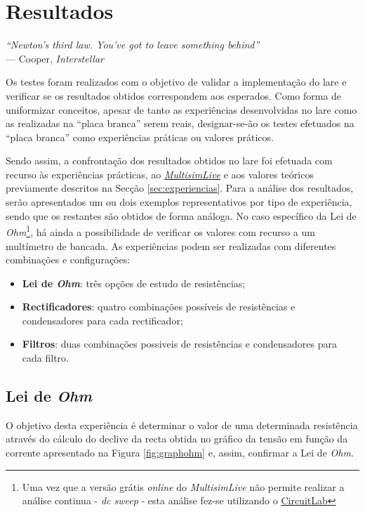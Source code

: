 \chapter{Resultados}
\label{Capítulo5}

\begin{flushright}
\textit{``Newton's third law. You've got to leave something behind''} \\[0.5em]
--- Cooper, \textit{Interstellar}
\end{flushright}

Os testes foram realizados com o objetivo de validar a implementação do \acrshort{lare} e verificar se os resultados obtidos correspondem aos esperados. Como forma de uniformizar conceitos, apesar de tanto as experiências desenvolvidas no \acrshort{lare} como as realizadas na ``placa branca'' serem reais, designar-se-ão os testes efetuados na ``placa branca'' como experiências práticas ou valores práticos.

Sendo assim, a confrontação dos resultados obtidos no \acrshort{lare} foi efetuada com recurso às experiências prácticas, ao \href{https://www.multisim.com}{\textit{MultisimLive}} e aos valores teóricos previamente descritos na Secção \ref{sec:experiencias}. Para a análise dos resultados, serão apresentados um ou dois exemplos representativos por tipo de experiência, sendo que os restantes são obtidos de forma análoga. No caso específico da Lei de \textit{Ohm}\footnote{Uma vez que a versão grátis \textit{online} do \textit{MultisimLive} não permite realizar a análise continua - \textit{dc sweep} - esta análise fez-se utilizando o \href{https://www.circuitlab.com/}{CircuitLab}}, há ainda a possibilidade de verificar os valores com recurso a um multímetro de bancada. As experiências podem ser realizadas com diferentes combinações e configurações:

\begin{itemize}
	\item \textbf{Lei de \textit{Ohm}}: três opções de estudo de resistências;
	\item \textbf{Rectificadores}: quatro combinações possíveis de resistências e condensadores para cada rectificador;
	\item \textbf{Filtros}: duas combinações possiveis de resistências e condensadores para cada filtro.
\end{itemize}

\section{Lei de \textit{Ohm}}
\label{sec:resultados_lei_de_ohm}
O objetivo desta experiência é determinar o valor de uma determinada resistência através do cálculo do declive da recta obtida no gráfico da tensão em função da corrente apresentado na Figura \ref{fig:graphohm} e, assim, confirmar a Lei de \textit{Ohm}.

